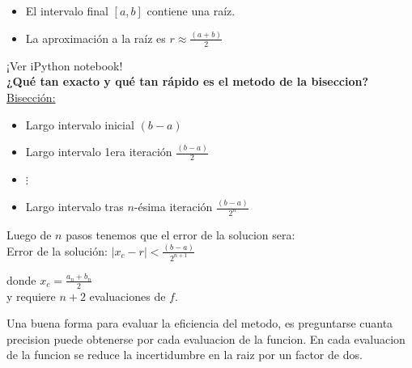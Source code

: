 \vspace{0.5cm}
\begin{itemize}
\item El intervalo final \([a, b]\) contiene una raíz. \\   
\item La aproximación a la raíz es \(r \approx \frac{(a + b)}{2}\)\\
\end{itemize}
\vspace{0.5cm}
¡Ver iPython notebook!\\
\vspace{0.5cm}
\hspace{1cm} \textbf{¿Qué tan exacto y qué tan rápido es el metodo de la biseccion?}\\
\vspace{0.3cm}
\underline{Bisección:} 
\begin{itemize} 
	\item Largo intervalo inicial \((b-a)\)\\
	\item Largo intervalo 1era iteración \(\frac{(b-a)}{2}\)\\
	\item \hspace{2cm}\( \vdots \) \\
	\item Largo intervalo tras $n$-ésima iteración $\frac{(b-a)}{2^n}$
	\vspace{0.5cm}
\end{itemize}
Luego de \(n\) pasos tenemos que el error de la solucion sera:\\
\vspace{0.2cm}
\hspace{0.5cm} Error de la solución: $ \displaystyle |x_c - r| < \frac{(b-a)}{2^{n+1}}$\\
\vspace{0.5cm}

\newpage
\hspace{1.5cm} donde \( \displaystyle x_c = \frac{a_n + b_n}{2}\)\\
\vspace{0.5cm}
\hspace{1cm} y requiere \(n+2\) evaluaciones de \(f\).\\
\vspace{0.5cm}

Una buena forma para evaluar la eficiencia del metodo, es preguntarse cuanta precision puede obtenerse por cada evaluacion de la funcion. En cada evaluacion de la funcion se reduce la incertidumbre en la raiz por un factor de dos.\\
\vspace{0.5cm}

